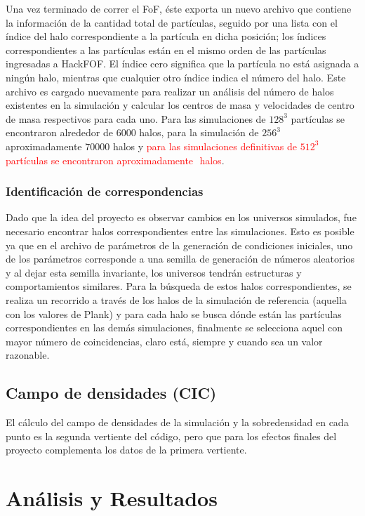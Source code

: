 Una vez terminado de correr el FoF, éste exporta un nuevo archivo que contiene la información de la cantidad total de partículas, seguido por una lista con el índice del halo correspondiente a la partícula en dicha posición; los índices correspondientes a las partículas están en el mismo orden de las partículas ingresadas a HackFOF. El índice cero significa que la partícula no está asignada a ningún halo, mientras que cualquier otro índice indica el número del halo. Este archivo es cargado nuevamente para realizar un análisis del número de halos existentes en la simulación y calcular los centros de masa y velocidades de centro de masa respectivos para cada uno. Para las simulaciones de $128^3$ partículas se encontraron alrededor de $6000$ halos, para la simulación de $256^3$ aproximadamente $70000$ halos y \textcolor{red}{para las simulaciones definitivas de $512^3$ partículas se encontraron aproximadamente $ $ halos}.

\subsubsection{Identificación de correspondencias}

Dado que la idea del proyecto es observar cambios en los universos simulados, fue necesario encontrar halos correspondientes entre las simulaciones. Esto es posible ya que en el archivo de parámetros de la generación de condiciones iniciales, uno de los parámetros corresponde a una semilla de generación de números aleatorios y al dejar esta semilla invariante, los universos tendrán estructuras y comportamientos similares. Para la búsqueda de estos halos correspondientes, se realiza un recorrido a través de los halos de la simulación de referencia (aquella con los valores de Plank) y para cada halo se busca dónde están las partículas correspondientes en las demás simulaciones, finalmente se selecciona aquel con mayor número de coincidencias, claro está, siempre y cuando sea un valor razonable. 


\subsection{Campo de densidades (CIC)}
\label{sub:CIC}
El cálculo del campo de densidades de la simulación y la sobredensidad en cada punto es la segunda vertiente del código, pero que para los efectos finales del proyecto complementa los datos de la primera vertiente. 


\section{Análisis y Resultados}
